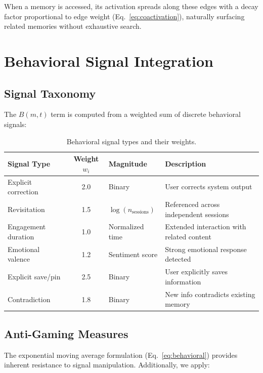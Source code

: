 \documentclass[11pt,a4paper]{article}
\begin{document}
When a memory is accessed, its activation spreads along these edges with a decay factor proportional to edge weight (Eq.~\ref{eq:coactivation}), naturally surfacing related memories without exhaustive search.


\section{Behavioral Signal Integration}
\label{sec:signals}

\subsection{Signal Taxonomy}

The $B(m, t)$ term is computed from a weighted sum of discrete behavioral signals:

\begin{table}[H]
\centering
\caption{Behavioral signal types and their weights.}
\label{tab:signals}
\small
\begin{tabularx}{\textwidth}{lclX}
\toprule
\textbf{Signal Type} & \textbf{Weight $w_i$} & \textbf{Magnitude} & \textbf{Description} \\
\midrule
Explicit correction & 2.0 & Binary & User corrects system output \\
Revisitation & 1.5 & $\log(n_{\text{sessions}})$ & Referenced across independent sessions \\
Engagement duration & 1.0 & Normalized time & Extended interaction with related content \\
Emotional valence & 1.2 & Sentiment score & Strong emotional response detected \\
Explicit save/pin & 2.5 & Binary & User explicitly saves information \\
Contradiction & 1.8 & Binary & New info contradicts existing memory \\
\bottomrule
\end{tabularx}
\end{table}

\subsection{Anti-Gaming Measures}

The exponential moving average formulation (Eq.~\ref{eq:behavioral}) provides inherent resistance to signal manipulation. Additionally, we apply:
\end{document}
